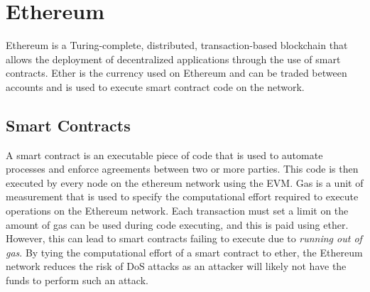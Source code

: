 
\section{Ethereum}

Ethereum is a Turing-complete, distributed, transaction-based blockchain that allows the deployment of decentralized applications through the use of smart contracts. Ether is the currency used on Ethereum and can be traded between accounts and is used to execute smart contract code on the network. 

\subsection*{Smart Contracts}

A smart contract is an executable piece of code that is used to automate processes and enforce agreements between two or more parties. This code is then executed by every node on the ethereum network using the EVM.
\x
Gas is a unit of measurement that is used to specify the computational effort required to execute operations on the Ethereum network. Each transaction must set a limit on the amount of gas can be used during code executing, and this is paid using ether. However, this can lead to smart contracts failing to execute due to \textit{running out of gas}.
By tying the computational effort of a smart contract to ether, the Ethereum network reduces the risk of DoS attacks as an attacker will likely not have the funds to perform such an attack.
